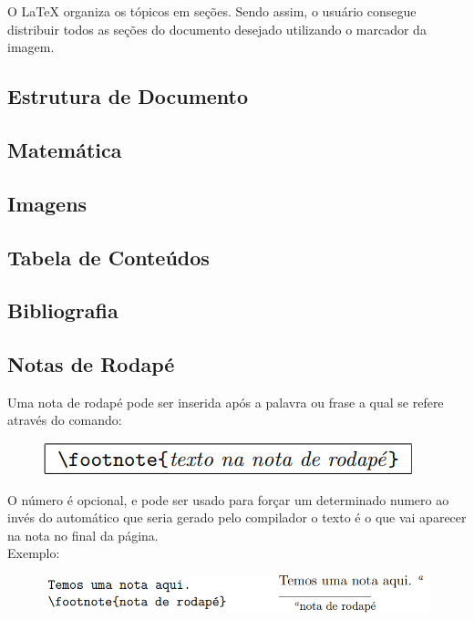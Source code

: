 \documentclass[12pt]{article}
\begin{document}
			O LaTeX organiza os tópicos em seções. Sendo assim, o usuário consegue distribuir todos as seções do documento desejado utilizando o marcador da imagem.
		    
		    
		\subsection{Estrutura de Documento}
		
		\subsection{Matemática}
		
		\subsection{Imagens}
		
		\subsection{Tabela de Conteúdos}
		
		\subsection{Bibliografia}
		
		\subsection{Notas de Rodapé}
			Uma nota de rodapé pode ser inserida após a palavra ou frase a qual se refere através do comando:
			\begin{figure}[h]
				\centering
				\includegraphics[scale=0.5]{no.png}
			\end{figure}
			
			O número é opcional, e pode ser usado para forçar um determinado numero ao invés do automático que seria gerado pelo compilador o texto é o que vai aparecer na nota no final da página.\\
			Exemplo:
			\begin{figure}[h]
				\centering
				\includegraphics[scale=0.45]{xx.png}
			\end{figure}
		
\end{document}
